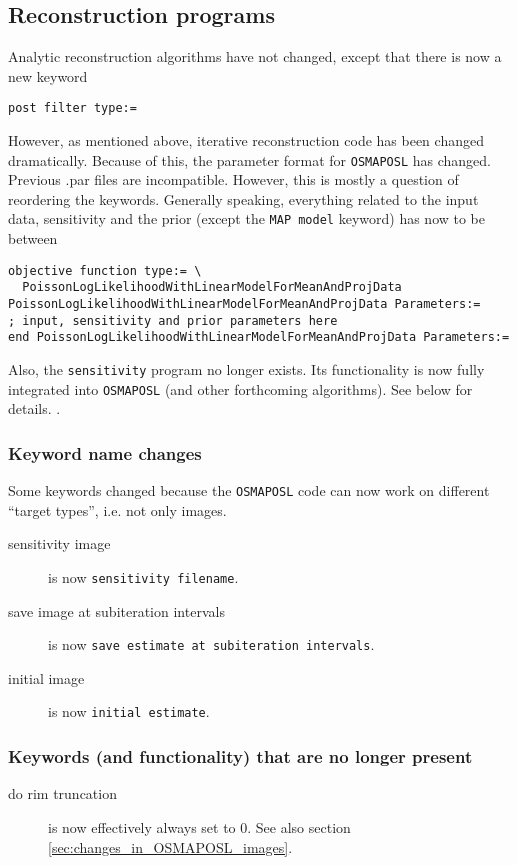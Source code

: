 \documentclass{article}
\begin{document}
\subsection{Reconstruction programs}
\label{sec:Reconstruction_programs}
Analytic reconstruction algorithms have not changed, except that there
is now a new keyword
\begin{verbatim}
post filter type:=
\end{verbatim}
However, as mentioned above, iterative reconstruction code has been 
changed dramatically. Because of this, the parameter format for 
\texttt{OSMAPOSL} has changed.
Previous .par files are incompatible. However, this is mostly a
question of reordering the keywords. Generally speaking, everything
related to the input data, sensitivity and the prior 
(except the \texttt{MAP model} keyword)
has now to be between
\begin{verbatim}
objective function type:= \
  PoissonLogLikelihoodWithLinearModelForMeanAndProjData
PoissonLogLikelihoodWithLinearModelForMeanAndProjData Parameters:=
; input, sensitivity and prior parameters here
end PoissonLogLikelihoodWithLinearModelForMeanAndProjData Parameters:=
\end{verbatim}
Also, the \texttt{sensitivity} program no longer exists. Its functionality
is now fully integrated into \texttt{OSMAPOSL} (and other forthcoming
algorithms). See below for details.
.
\subsubsection{Keyword name changes}
Some keywords changed because the \texttt{OSMAPOSL} code can now work
on different ``target types'', i.e. not only images.
\begin{description}
\item[sensitivity image] is now \texttt{sensitivity filename}.
\item[save image at subiteration intervals] is now
  \texttt{save estimate at subiteration intervals}.
\item[initial image] is now \texttt{initial estimate}.
\end{description}

\subsubsection{Keywords (and functionality) that are no longer present}
\begin{description}
\item[do rim truncation] is now effectively always set to 0. See also
section \ref{sec:changes_in_OSMAPOSL_images}.
\end{description}
\end{document}
